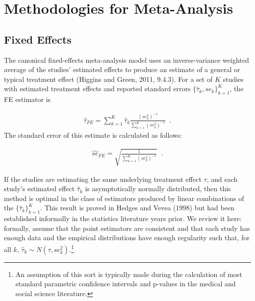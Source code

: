 \documentclass[12pt]{article}
\begin{document}
\section{Methodologies for Meta-Analysis}


\subsection{Fixed Effects}

The canonical fixed-effects meta-analysis model uses an inverse-variance weighted average of the studies' estimated effects to produce an estimate of a general or typical treatment effect (Higgins and Green, 2011, 9.4.3). For a set of $K$ studies with estimated treatment effects and reported standard errors  $\{\hat{\tau}_k, se_k\}_{k=1}^K$, the FE estimator is

\begin{equation}
\label{fe_tau}
\begin{aligned}
\hat{\tau}_{FE} = \sum_{k=1}^K \hat{\tau}_k \frac{  (se^2_k)^{-1}   }{  \sum_{k=1}^K  (se^2_k)^{-1}  } \; \; .
\end{aligned}
\end{equation}
The standard error of this estimate is calculated as follows:

\begin{equation}
\label{fe_se}
\begin{aligned}
\hat{se}_{FE} = \sqrt{ \frac{ 1  }{  \sum_{k=1}^K  (se^2_k)^{-1}  }} \; \; .
\end{aligned}
\end{equation}

If the studies are estimating the same underlying treatment effect $\tau$, and each study's estimated effect $\hat{\tau}_k$ is asymptotically  normally distributed, then this method is optimal in the class of estimators produced by linear combinations of the $\{\hat{\tau}_k\}_{k=1}^K$. This result is proved in Hedges and Vevea (1998) but had been established informally in the statistics literature years prior. We review it here: formally, assume that the point estimators are consistent and that each study has enough data and the empirical distributions have enough regularity such that, for all $k$, $\hat{\tau}_k \sim N(\tau, se^2_{k})$.\footnote{An assumption of this sort is typically made during the calculation of most standard parametric confidence intervals and p-values in the medical and social science literature.}
\end{document}
